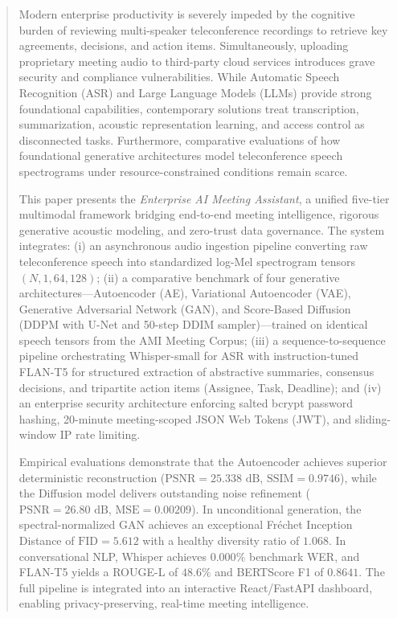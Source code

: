\documentclass[conference]{IEEEtran}
\begin{document}
\begin{abstract}
Modern enterprise productivity is severely impeded by the cognitive burden of reviewing multi-speaker teleconference recordings to retrieve key agreements, decisions, and action items. Simultaneously, uploading proprietary meeting audio to third-party cloud services introduces grave security and compliance vulnerabilities. While Automatic Speech Recognition (ASR) and Large Language Models (LLMs) provide strong foundational capabilities, contemporary solutions treat transcription, summarization, acoustic representation learning, and access control as disconnected tasks. Furthermore, comparative evaluations of how foundational generative architectures model teleconference speech spectrograms under resource-constrained conditions remain scarce.

This paper presents the \textit{Enterprise AI Meeting Assistant}, a unified five-tier multimodal framework bridging end-to-end meeting intelligence, rigorous generative acoustic modeling, and zero-trust data governance. The system integrates: (i) an asynchronous audio ingestion pipeline converting raw teleconference speech into standardized log-Mel spectrogram tensors $(N, 1, 64, 128)$; (ii) a comparative benchmark of four generative architectures---Autoencoder (AE), Variational Autoencoder (VAE), Generative Adversarial Network (GAN), and Score-Based Diffusion (DDPM with U-Net and 50-step DDIM sampler)---trained on identical speech tensors from the AMI Meeting Corpus; (iii) a sequence-to-sequence pipeline orchestrating Whisper-small for ASR with instruction-tuned FLAN-T5 for structured extraction of abstractive summaries, consensus decisions, and tripartite action items (Assignee, Task, Deadline); and (iv) an enterprise security architecture enforcing salted bcrypt password hashing, 20-minute meeting-scoped JSON Web Tokens (JWT), and sliding-window IP rate limiting.

Empirical evaluations demonstrate that the Autoencoder achieves superior deterministic reconstruction ($\text{PSNR} = 25.338\text{ dB}$, $\text{SSIM} = 0.9746$), while the Diffusion model delivers outstanding noise refinement ($\text{PSNR} = 26.80\text{ dB}$, $\text{MSE} = 0.00209$). In unconditional generation, the spectral-normalized GAN achieves an exceptional Fr\'echet Inception Distance of $\text{FID} = 5.612$ with a healthy diversity ratio of $1.068$. In conversational NLP, Whisper achieves $0.000\%$ benchmark WER, and FLAN-T5 yields a ROUGE-L of $48.6\%$ and BERTScore F1 of $0.8641$. The full pipeline is integrated into an interactive React/FastAPI dashboard, enabling privacy-preserving, real-time meeting intelligence.
\end{abstract}
\end{document}
